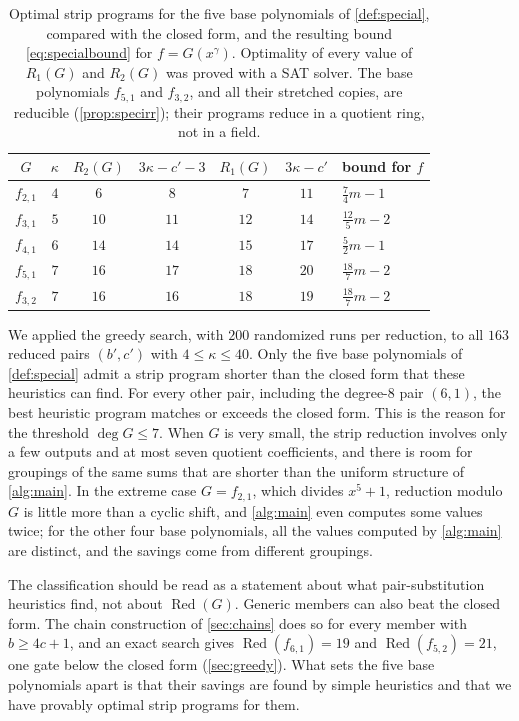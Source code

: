 \documentclass{ieeeaccess}
\theoremstyle{plain}
\theoremstyle{definition}
\newcommand{\Red}{\operatorname{Red}}
\begin{document}
\begin{table}[t]
\centering\small
\caption{Optimal strip programs for the five base polynomials of
\cref{def:special}, compared with the closed form, and the resulting bound
\eqref{eq:specialbound} for $f=G(x^\gamma)$. Optimality of every value of
$R_1(G)$ and $R_2(G)$ was proved with a SAT solver. The base polynomials
$f_{5,1}$ and $f_{3,2}$, and all their stretched copies, are reducible
(\cref{prop:specirr}); their programs reduce in a quotient ring, not in a
field.}
\label{tab:base}
\setlength{\tabcolsep}{4pt}
\begin{tabular}{@{}c c c c c c l@{}}
\toprule
$G$ & $\kappa$ & $R_2(G)$ & $3\kappa-c'-3$ & $R_1(G)$ & $3\kappa-c'$ & bound for $f$\\
\midrule
$f_{2,1}$ & $4$ & $6$  & $8$  & $7$  & $11$ & $\tfrac74m-1$\\
$f_{3,1}$ & $5$ & $10$ & $11$ & $12$ & $14$ & $\tfrac{12}5m-2$\\
$f_{4,1}$ & $6$ & $14$ & $14$ & $15$ & $17$ & $\tfrac52m-1$\\
$f_{5,1}$ & $7$ & $16$ & $17$ & $18$ & $20$ & $\tfrac{18}7m-2$\\
$f_{3,2}$ & $7$ & $16$ & $16$ & $18$ & $19$ & $\tfrac{18}7m-2$\\
\bottomrule
\end{tabular}
\end{table}

We applied the greedy search, with $200$ randomized runs per reduction, to all
$163$ reduced pairs $(b',c')$ with $4\le\kappa\le40$. Only the five base polynomials
of \cref{def:special} admit a strip program shorter than the closed form that
these heuristics can find. For every other pair, including the degree-$8$ pair
$(6,1)$, the best heuristic program matches or exceeds the closed form. This is
the reason for the threshold $\deg G\le7$. When $G$ is very small, the strip
reduction involves only a few outputs and at most seven quotient coefficients,
and there is room for groupings of the same sums that are shorter than the
uniform structure of \cref{alg:main}. In the extreme case $G=f_{2,1}$, which
divides $x^5+1$, reduction modulo $G$ is little more than a cyclic shift, and
\cref{alg:main} even computes some values twice; for the other four base
polynomials, all the values computed by \cref{alg:main} are distinct, and the
savings come from different groupings.

The classification should be read as a statement about what pair-substitution
heuristics find, not about $\Red(G)$. Generic members can also beat the closed
form. The chain construction of \cref{sec:chains} does so for every member with
$b\ge4c+1$, and an exact search gives $\Red(f_{6,1})=19$ and $\Red(f_{5,2})=21$,
one gate below the closed form (\cref{sec:greedy}). What sets the five base
polynomials apart is that their savings are found by simple heuristics and that
we have provably optimal strip programs for them.
\end{document}
